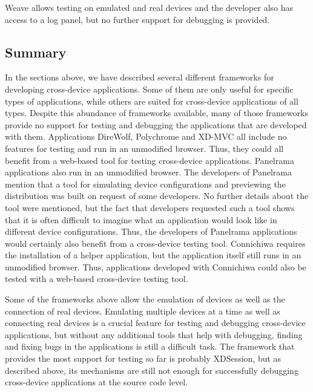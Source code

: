 Weave allows testing on emulated and real devices and the developer also has access to a log panel, but no further support for debugging is provided. 

\subsection{Summary}

In the sections above, we have described several different frameworks for developing cross-device applications. Some of them are only useful for specific types of applications, while others are suited for cross-device applications of all types. Despite this abundance of frameworks available, many of those frameworks provide no support for testing and debugging the applications that are developed with them. Applications DireWolf, Polychrome and XD-MVC all include no features for testing and run in an unmodified browser. Thus, they could all benefit from a web-based tool for testing cross-device applications. Panelrama applications also run in an unmodified browser. The developers of Panelrama mention that a tool for simulating device configurations and previewing the distribution was built on request of some developers. No further details about the tool were mentioned, but the fact that developers requested such a tool shows that it is often difficult to imagine what an application would look like in different device configurations. Thus, the developers of Panelrama applications would certainly also benefit from a cross-device testing tool. Connichiwa requires the installation of a helper application, but the application itself still runs in an unmodified browser. Thus, applications developed with Connichiwa could also be tested with a web-based cross-device testing tool.

Some of the frameworks above allow the emulation of devices as well as the connection of real devices. Emulating multiple devices at a time as well as connecting real devices is a crucial feature for testing and debugging cross-device applications, but without any additional tools that help with debugging, finding and fixing bugs in the applications is still a difficult task. The framework that provides the most support for testing so far is probably XDSession, but as described above, its mechanisms are still not enough for successfully debugging cross-device applications at the source code level.